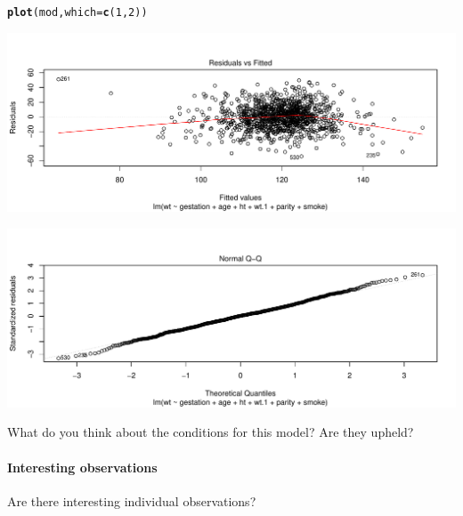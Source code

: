 \documentclass[10pt]{article}\usepackage[]{graphicx}\usepackage[]{color}
\makeatletter
\def\maxwidth{ %
  \ifdim\Gin@nat@width>\linewidth
    \linewidth
  \else
    \Gin@nat@width
  \fi
}
\newcommand{\hlnum}[1]{\textcolor[rgb]{0.686,0.059,0.569}{#1}}%
\newcommand{\hlstd}[1]{\textcolor[rgb]{0.345,0.345,0.345}{#1}}%
\newcommand{\hlkwc}[1]{\textcolor[rgb]{0.333,0.667,0.333}{#1}}%
\newcommand{\hlkwd}[1]{\textcolor[rgb]{0.737,0.353,0.396}{\textbf{#1}}}%
\newenvironment{kframe}{%
 \def\at@end@of@kframe{}%
 \ifinner\ifhmode%
  \def\at@end@of@kframe{\end{minipage}}%
  \begin{minipage}{\columnwidth}%
 \fi\fi%
 \def\FrameCommand##1{\hskip\@totalleftmargin \hskip-\fboxsep
 \colorbox{shadecolor}{##1}\hskip-\fboxsep
     \hskip-\linewidth \hskip-\@totalleftmargin \hskip\columnwidth}%
 \MakeFramed {\advance\hsize-\width
   \@totalleftmargin\z@ \linewidth\hsize
   \@setminipage}}%
 {\par\unskip\endMakeFramed%
 \at@end@of@kframe}
\newenvironment{knitrout}{}{} %
\makeatother
\begin{document}
\begin{knitrout}\footnotesize
{}\color{fgcolor}\begin{kframe}
\begin{alltt}
\hlkwd{plot}\hlstd{(mod,} \hlkwc{which}\hlstd{=}\hlkwd{c}\hlstd{(}\hlnum{1}\hlstd{,}\hlnum{2}\hlstd{))}
\end{alltt}
\end{kframe}
\includegraphics[width=\maxwidth]{figure/unnamed-chunk-6-1} 

\includegraphics[width=\maxwidth]{figure/unnamed-chunk-6-2} 

\end{knitrout}

What do you think about the conditions for this model? Are they upheld?

\paragraph{Interesting observations} Are there interesting individual observations?
\end{document}
